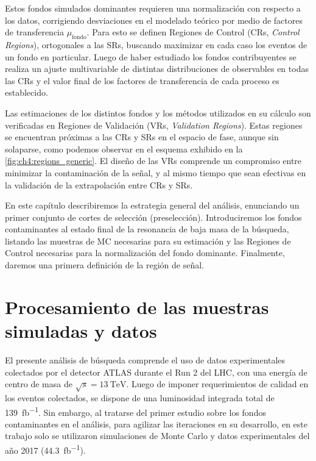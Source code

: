 Estos fondos simulados dominantes requieren una normalización con respecto a los datos, corrigiendo desviaciones en el modelado teórico por medio de factores de transferencia $\mu_{\text{fondo}}$. Para esto se definen Regiones de Control (CRs, \textit{Control Regions}), ortogonales a las SRs, buscando maximizar en cada caso los eventos de un fondo en particular. Luego de haber estudiado los fondos contribuyentes se realiza un ajuste multivariable de distintas distribuciones de observables en todas las CRs y el valor final de los factores de transferencia de cada proceso es establecido.

Las estimaciones de los distintos fondos y los métodos utilizados en su cálculo son verificadas en Regiones de Validación (VRs, \textit{Validation Regions}). Estas regiones se encuentran próximas a las CRs y SRs en el espacio de fase, aunque sin solaparse, como podemos observar en el esquema exhibido en la \cref{fig:ch4:regions_generic}. El diseño de las VRs comprende un compromiso entre minimizar la contaminación de la señal, y al mismo tiempo que sean efectivas en la validación de la extrapolación entre CRs y SRs.

En este capítulo describiremos la estrategia general del análisis, enunciando un primer conjunto de cortes de selección (preselección). Introduciremos los fondos contaminantes al estado final de la resonancia de baja masa de la búsqueda, listando las muestras de MC necesarias para su estimación y las Regiones de Control necesarias para la normalización del fondo dominante. Finalmente, daremos una primera definición de la región de señal.


\section{Procesamiento de las muestras simuladas y datos} \label{sec:ch4:processing}

El presente análisis de búsqueda comprende el uso de datos experimentales colectados por el detector ATLAS durante el Run 2 del LHC, con una energía de centro de masa de $\sqrt{s} = \SI{13}{\TeV}$. Luego de imponer requerimientos de calidad en los eventos colectados, se dispone de una luminosidad integrada total de \SI{139}{\femto\barn^{-1}}. Sin embargo, al tratarse del primer estudio sobre los fondos contaminantes en el análisis, para agilizar las iteraciones en su desarrollo, en este trabajo solo se utilizaron simulaciones de Monte Carlo y datos experimentales del año 2017 (\SI{44.3}{\femto\barn^{-1}}).

